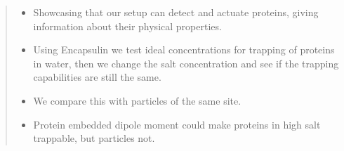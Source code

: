 \begin{quote}
	\begin{itemize}
		\item Showcasing that our setup can detect and actuate proteins, giving information about their physical properties.
		\item Using Encapsulin we test ideal concentrations for trapping of proteins in water, then we change the salt concentration and see if the trapping capabilities are still the same.
		\item We compare this with particles of the same site.
		\item Protein embedded dipole moment could make proteins in high salt trappable, but particles not. 
	\end{itemize}
\end{quote}

